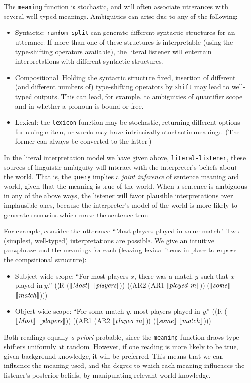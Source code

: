 \documentclass[pdfextras]{handbook}
\newcommand{\llbracket}{\ensuremath{\left [\!\left [}}%
\newcommand{\rrbracket}{\ensuremath{\right ]\!\right ]}}
\providecommand{\sv}[1]{\ensuremath{\llbracket \mathit{#1} \rrbracket}}
\begin{document}
The \lstinline{meaning} function is stochastic, and will often associate utterances with several well-typed meanings. 
Ambiguities can arise due to any of the following:
\begin{itemize}
\item Syntactic: \lstinline{random-split} can generate different syntactic structures for an utterance. 
If more than one of these structures is interpretable (using the type-shifting operators available), the literal listener will entertain interpretations with different syntactic structures.
\item Compositional: Holding the syntactic structure fixed, insertion of different (and different numbers of) type-shifting operators by \lstinline{shift} may lead to well-typed outputs. This can lead, for example, to ambiguities of quantifier scope and in whether a pronoun is bound or free.
\item Lexical: the \lstinline{lexicon} function may be stochastic, returning different options for a single item, or words may have intrinsically stochastic meanings. (The former can always be converted to the latter.)
\end{itemize}
In the literal interpretation model we have given above, \lstinline{literal-listener}, these sources of linguistic ambiguity will interact with the interpreter's beliefs about the world.
That is, the \lstinline{query} implies a \emph{joint inference} of sentence meaning and world, given that the meaning is true of the world.
When a sentence is ambiguous in any of the above ways, the listener will favor plausible interpretations over implausible ones, because the interpreter's model of the world is more likely to generate scenarios which make the sentence true. 

For example, consider the utterance ``Most players played in some match''. 
Two (simplest, well-typed) interpretations are possible. We give an intuitive paraphrase and the meanings for each (leaving lexical items in place to expose the compsitional structure):
\begin{itemize}
\item Subject-wide scope:
\subitem ``For most players $x$, there was a match $y$ such that $x$ played in $y$.'' 
\subitem ((R (\sv{Most} \sv{players})) ((AR2 (AR1 \sv{played\ in})) (\sv{some} \sv{match})))
\item Object-wide scope: 
\subitem ``For some match $y$, most players played in $y$.''
\subitem ((R (\sv{Most} \sv{players})) ((AR1 (AR2 \sv{played\ in})) (\sv{some} \sv{match})))
\end{itemize}
Both readings equally \emph{a priori} probable, since the \lstinline{meaning} function draws type-shifters uniformly at random. 
However, if one reading is more likely to be true, given background knowledge, it will be preferred.
This means that we can influence the meaning used, and the degree to which each meaning influences the listener's posterior beliefs, by manipulating relevant world knowledge.
\end{document}
